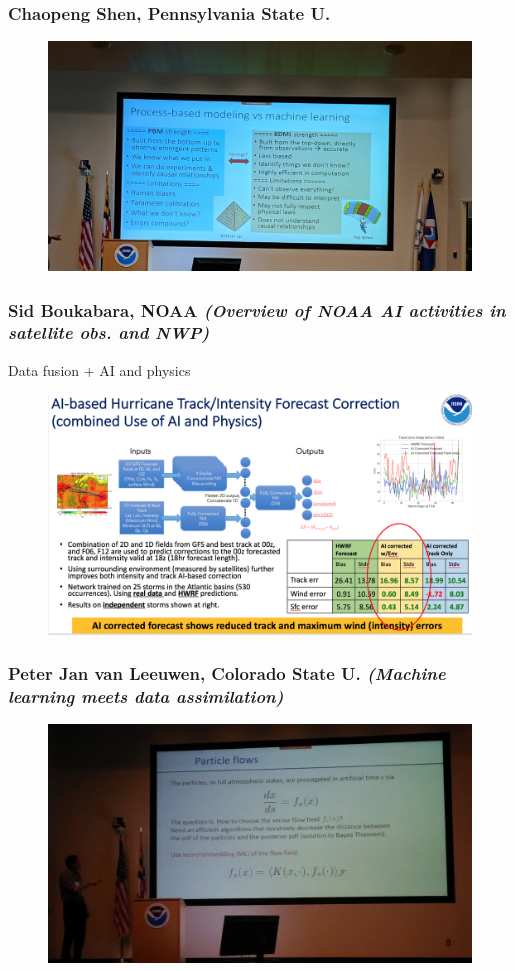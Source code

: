 \documentclass{beamer}
\begin{document}
\begin{frame}
\frametitle{Chaopeng Shen, Pennsylvania State U.}
\begin{figure}
	\includegraphics[width=.9\linewidth]{figs/IMG_20190424_114651.jpg}
\end{figure}
\end{frame}

\begin{frame}
\frametitle{Sid Boukabara, NOAA \textit{(Overview of NOAA AI activities in satellite obs. and NWP)}}
Data fusion + AI and physics
\begin{figure}
	\includegraphics[width=.9\linewidth]{figs/ScreenShot_Hurricane.png}
	
\end{figure}
\end{frame}


\begin{frame}
\frametitle{Peter Jan van Leeuwen, Colorado State U. \textit{(Machine learning meets data assimilation)}}
\begin{figure}
	\includegraphics[width=.9\linewidth]{figs/P_20190424_142507.jpg}
\end{figure}
\end{frame}
\end{document}
